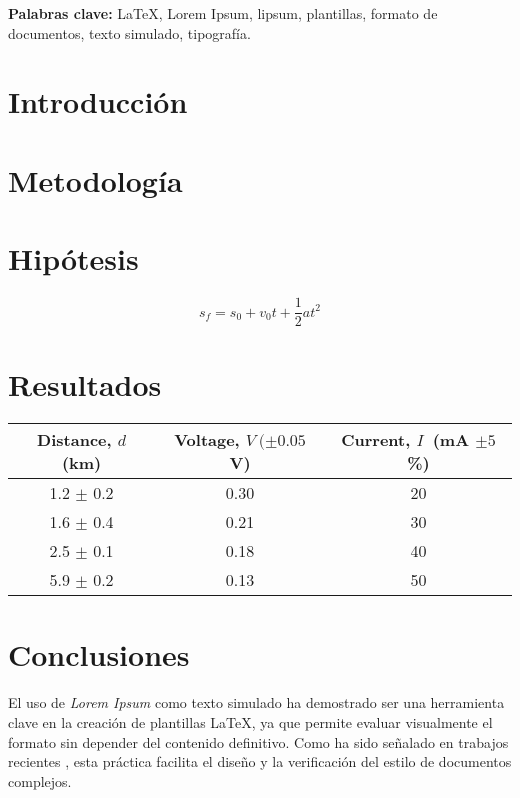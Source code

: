 \documentclass[11pt,letterpaper]{article}
\begin{document}
\smallskip
\noindent\textbf{Palabras clave:} \LaTeX{}, Lorem Ipsum, lipsum, plantillas, formato de documentos, texto simulado, tipografía.



\section*{Introducción}
\lipsum[1-2]


\section*{Metodología}
\lipsum[3-6] 

\section*{Hipótesis}
\lipsum[7]
\[s_f=s_0+v_0t+\frac{1}{2}at^2\]

\section*{Resultados}
\lipsum[8-10]
\begin{table}[ht]
\begin{center}
\label{table1} 
\begin{tabular}{ccc}
\hline
\multicolumn{1}{c}{Distance, $d$ (km) } & \multicolumn{1}{c}{Voltage, $V\ (\pm 0.05$ V)} & \multicolumn{1}{c}{Current, $I$\ (mA $\pm 5$\%)}\\
\hline
1.2 $\pm$ 0.2 &  0.30 & 20 \\
1.6 $\pm$ 0.4 &  0.21 & 30 \\
2.5 $\pm$ 0.1 &  0.18 & 40 \\
5.9 $\pm$ 0.2 &  0.13 & 50 \\
\hline
\end{tabular}
\end{center}
\end{table}

\section*{Conclusiones}

El uso de \textit{Lorem Ipsum} como texto simulado ha demostrado ser una herramienta clave en la creación de plantillas \LaTeX{}, ya que permite evaluar visualmente el formato sin depender del contenido definitivo. Como ha sido señalado en trabajos recientes \cite{gutierrez2025lorem}, esta práctica facilita el diseño y la verificación del estilo de documentos complejos.
\end{document}
